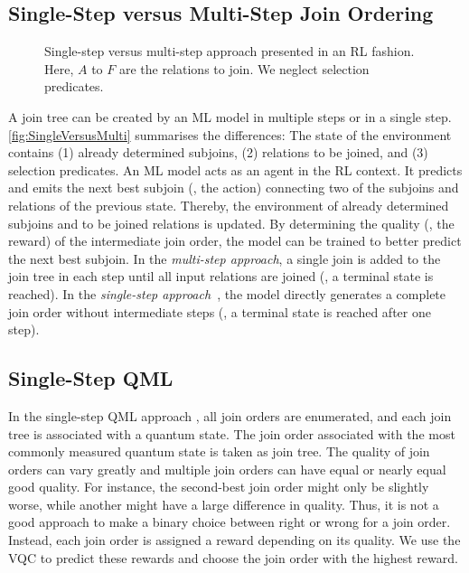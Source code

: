 \documentclass[10pt, conference]{IEEEtran}
\begin{document}
\subsection{Single-Step versus Multi-Step Join Ordering}
\label{sec:meth-single-versus-multi-step}


\begin{figure}[htb]
  \centering
  
  \vspace*{-2em}
  \caption{Single-step versus multi-step approach presented in an RL fashion. Here, $A$ to $F$ are the relations to join. We neglect selection predicates.}\label{fig:SingleVersusMulti}
\end{figure}

A join tree can be created by an ML model in multiple steps or in a single step. \autoref{fig:SingleVersusMulti} summarises the differences:
The state of the environment contains
(1) already determined subjoins, (2) relations to be joined, and (3) selection predicates.
An ML model acts as an agent in the RL context. It predicts and emits the next best subjoin (\ie, the action) connecting two of the subjoins and relations of the previous state.
Thereby, the environment of already determined subjoins and to be joined relations is updated.
By determining the quality (\ie, the reward) of the intermediate join order, the model can be trained to better predict the next best subjoin.
In the \emph{multi-step approach}, a single join is added to the join tree in each step until all input relations are joined (\ie, a terminal state is reached).
In the \emph{single-step approach}~\cite{winker23}, the model directly generates
a complete join order without intermediate steps (\ie, a terminal state is
reached after one step).


\subsection{Single-Step QML}
\label{sec:meth-single-step}

In the single-step QML approach \cite{winker23}, all join orders are enumerated, and each join tree is associated with a quantum state. The join order associated with the most commonly measured quantum state is taken as join tree. The quality of join orders can vary greatly and multiple join orders can have equal or nearly equal good quality. For instance, the second-best join order might only be slightly worse, while another might have a large difference in quality. Thus, it is not a good approach to make a binary choice between right or wrong for a join order. Instead, each join order is assigned a reward depending on its quality. We use the VQC to predict these rewards and choose the join order with the highest reward.
\end{document}
